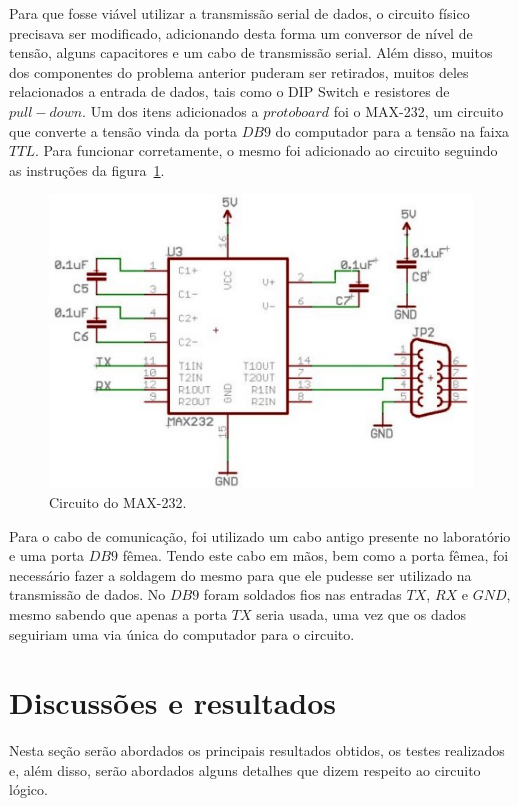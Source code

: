 \documentclass[12pt]{article}
\begin{document}
Para que fosse viável utilizar a transmissão serial de dados, o circuito físico precisava ser modificado, adicionando desta forma um conversor de nível de tensão, alguns capacitores e um cabo de transmissão serial. Além disso, muitos dos componentes do problema anterior puderam ser retirados, muitos deles relacionados a entrada de dados, tais como o DIP Switch e resistores de $pull-down$. Um dos itens adicionados a $protoboard$ foi o MAX-232, um circuito que converte a tensão vinda da porta $DB9$ do computador para a tensão na faixa $TTL$. Para funcionar corretamente, o mesmo foi adicionado ao circuito seguindo as instruções da figura~\ref{fig:max232}.

\begin{figure}[h]
\centering
\includegraphics[width=.8\textwidth]{img/232.jpg}
\caption{Circuito do MAX-232.}
\label{fig:max232}
\end{figure}

Para o cabo de comunicação, foi utilizado um cabo antigo presente no laboratório e uma porta $DB9$ fêmea. Tendo este cabo em mãos, bem como a porta fêmea, foi necessário fazer a soldagem do mesmo para que ele pudesse ser utilizado na transmissão de dados. No $DB9$ foram soldados fios nas entradas $TX$, $RX$ e $GND$, mesmo sabendo que apenas a porta $TX$ seria usada, uma vez que os dados seguiriam uma via única do computador para o circuito.

\section{Discussões e resultados}

Nesta seção serão abordados os principais resultados obtidos, os testes realizados e, além disso, serão abordados alguns detalhes que dizem respeito ao circuito lógico.
\end{document}
